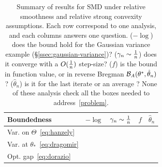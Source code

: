 \documentclass[twoside]{article}
\newcommand*{\expect}[2][]{\ensuremath{\mathbb{E}_{#1} \left[ #2 \right] }} %
\newcommand*{\expecti}[2][]{\ensuremath{\mathbb{E}_{#1} [ #2 ] }} %
\newcommand{\cond}{\,\vert\,}
\newcommand{\logpart}{A}
\newcommand{\bregman}{\cB_\logpart}
\newcommand{\nat}{\theta}
\newcommand{\m}{\mu}
\newcommand{\lr}{\gamma} %
\begin{document}
\begin{table}[t]
\newcommand*{\greencmark}{\textcolor{Green}{\cmark}}
\newcommand*{\redxmark}{\textcolor{Red}{\xmark}}
\caption{Summary of results for SMD
under relative smoothness and relative strong convexity assumptions.
Each row correspond to one analysis, and each columns answers one question.
($-\log$) does the bound hold for the Gaussian variance example (\S\ref{ssec:gaussian-variance})?
($\lr_n \sim \inv{n}$) does it converge with a $O(\frac{1}{n})$ step-size?
($f$) is the bound in function value, or in reverse Bregman $\bregman(\nat^*,\hat\nat_n)$?
 ($\hat\nat_n$) is it for the last iterate or an average ?
None of these analysis check all the boxes needed to address~\eqref{problem}.
}
\begin{center}
\begin{tabular}{lcccc}
\toprule
Boundedness & $-\log$ &  $\lr_n \sim \inv{n}$ & $f$ & $\hat\nat_n$ \\
\midrule
Var. on $\Theta$~\eqref{eq:hanzely} %
& \redxmark & \greencmark & \greencmark  & \redxmark
\\
Var. at $\theta_*$~\eqref{eq:dragomir} %
& \redxmark & \greencmark & \redxmark  & \greencmark
\\
Opt. gap~\eqref{eq:dorazio} %
& \greencmark & \redxmark & \redxmark & \greencmark
\\
\bottomrule
\end{tabular}
\end{center}
\label{tbl:assumptions}
\end{table}


\end{document}
